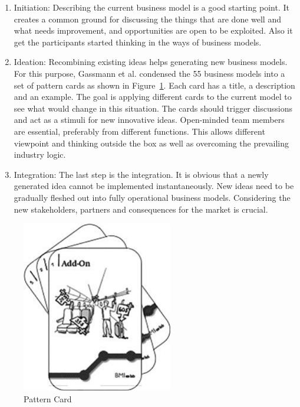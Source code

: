 		\begin{enumerate}					
			\item Initiation: Describing the current business model is a good starting point. It creates a common ground for discussing the things that are done well and what needs improvement, and opportunities are open to be exploited. Also it get the participants started thinking in the ways of business models.

			\item Ideation: Recombining existing ideas helps generating new business models. For this purpose, Gassmann et al. condensed the 55 business models into a set of pattern cards as shown in Figure~\ref{fig:pattern_card}. Each card has a title, a description and an example. The goal is applying different cards to the current model to see what would change in this situation. The cards should trigger discussions and act as a stimuli for new innovative ideas. Open-minded team members are essential, preferably from different functions. This allows different viewpoint and thinking outside the box as well as overcoming the prevailing industry logic.
			
			\item Integration: The last step is the integration. It is obvious that a newly generated idea cannot be implemented instantaneously. New ideas need to be gradually fleshed out into fully operational business models. Considering the new stakeholders, partners and consequences for the market is crucial.
		\end{enumerate}

		\begin{figure}[ht]
		    \begin{center}
			    \includegraphics[scale=1.0]{Talk11/gassmann_card.pdf}
		    \end{center}
		    \caption{Pattern Card \cite[p.~95]{gassmann55}}
		    \label{fig:pattern_card}
		\end{figure}	
